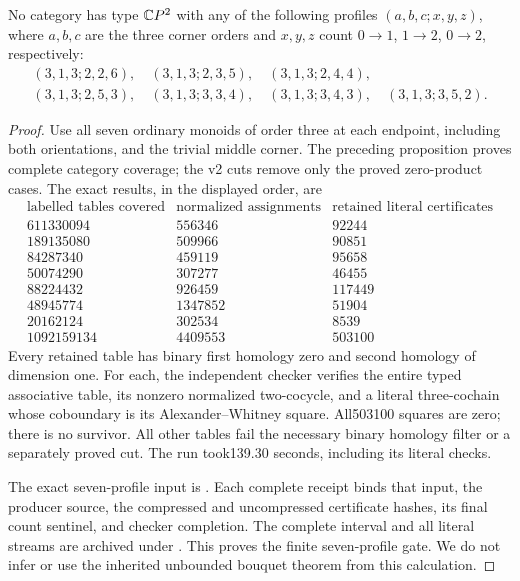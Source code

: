 \begin{theorem}
\label{CP2:A-seven-small-adjacent-profiles}
No category has type $\mathbb{C}P^2$ with any of the following profiles
$(a,b,c;x,y,z)$, where $a,b,c$ are the three corner orders
and $x,y,z$ count $0\to1$, $1\to2$, $0\to2$, respectively:
\[
\begin{gathered}
 (3,1,3;2,2,6),\quad(3,1,3;2,3,5),\quad(3,1,3;2,4,4),\\
 (3,1,3;2,5,3),\quad(3,1,3;3,3,4),\quad
 (3,1,3;3,4,3),\quad(3,1,3;3,5,2).
\end{gathered}
\]
\end{theorem}
\begin{proof}
Use all seven ordinary monoids of order three at each endpoint,
including both orientations, and the trivial middle corner.
The preceding proposition proves complete category coverage;
the v2 cuts remove only the proved zero-product cases.
The exact results, in the displayed order, are
\[
\begin{array}{r|r|r}
 \text{labelled tables covered}&\text{normalized assignments}
    &\text{retained literal certificates}\\\hline
611330094&556346&92244\\
189135080&509966&90851\\
84287340&459119&95658\\
50074290&307277&46455\\
88224432&926459&117449\\
48945774&1347852&51904\\
20162124&302534&8539\\\hline
1092159134&4409553&503100
\end{array}
\]
Every retained table has binary first homology zero and second
homology of dimension one. For each, the independent checker
verifies the entire typed associative table, its nonzero
normalized two-cocycle, and a literal three-cochain whose
coboundary is its Alexander--Whitney square. All503100 squares
are zero; there is no survivor. All other tables fail the
necessary binary homology filter or a separately proved cut.
The run took139.30 seconds, including its literal checks.

The exact seven-profile input is
. Each complete
receipt binds that input, the producer source, the compressed
and uncompressed certificate hashes, its final count sentinel,
and checker completion. The complete interval and all literal
streams are archived under .
This proves the finite seven-profile gate. We do not infer or
use the inherited unbounded bouquet theorem from this calculation.
\end{proof}
